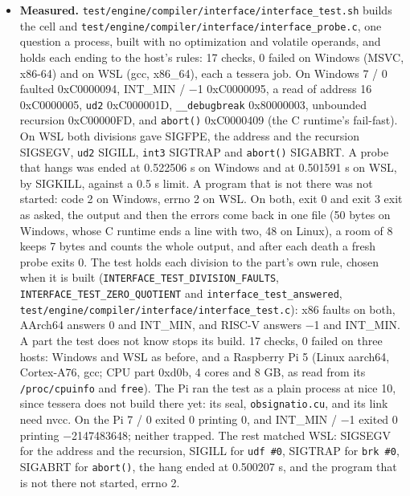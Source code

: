 \begin{enumerate}
\begin{itemize}
\begin{enumerate}
\begin{itemize}
\item \textbf{Measured.} \texttt{test/\allowbreak{}engine/\allowbreak{}compiler/\allowbreak{}interface/\allowbreak{}interface\_\allowbreak{}test.\allowbreak{}sh} builds the cell and \texttt{test/\allowbreak{}engine/\allowbreak{}compiler/\allowbreak{}interface/\allowbreak{}interface\_\allowbreak{}probe.\allowbreak{}c}, one question a process, built with no optimization and volatile operands, and holds each ending to the host's rules: 17 checks, 0 failed on Windows (MSVC, x86-64) and on WSL (gcc, x86\_\allowbreak{}64), each a tessera job. On Windows 7 / 0 faulted 0xC0000094, INT\_\allowbreak{}MIN / −1 0xC0000095, a read of address 16 0xC0000005, \texttt{ud2} 0xC000001D, \texttt{\_\allowbreak{}\_\allowbreak{}debugbreak} 0x80000003, unbounded recursion 0xC00000FD, and \texttt{abort()} 0xC0000409 (the C runtime's fail-fast). On WSL both divisions gave SIGFPE, the address and the recursion SIGSEGV, \texttt{ud2} SIGILL, \texttt{int3} SIGTRAP and \texttt{abort()} SIGABRT. A probe that hangs was ended at 0.522506 s on Windows and at 0.501591 s on WSL, by SIGKILL, against a 0.5 s limit. A program that is not there was not started: code 2 on Windows, errno 2 on WSL. On both, exit 0 and exit 3 exit as asked, the output and then the errors come back in one file (50 bytes on Windows, whose C runtime ends a line with two, 48 on Linux), a room of 8 keeps 7 bytes and counts the whole output, and after each death a fresh probe exits 0. The test holds each division to the part's own rule, chosen when it is built (\texttt{INTERFACE\_\allowbreak{}TEST\_\allowbreak{}DIVISION\_\allowbreak{}FAULTS}, \texttt{INTERFACE\_\allowbreak{}TEST\_\allowbreak{}ZERO\_\allowbreak{}QUOTIENT} and \texttt{interface\_\allowbreak{}test\_\allowbreak{}answered}, \texttt{test/\allowbreak{}engine/\allowbreak{}compiler/\allowbreak{}interface/\allowbreak{}interface\_\allowbreak{}test.\allowbreak{}c}): x86 faults on both, AArch64 answers 0 and INT\_\allowbreak{}MIN, and RISC-V answers −1 and INT\_\allowbreak{}MIN. A part the test does not know stops its build. 17 checks, 0 failed on three hosts: Windows and WSL as before, and a Raspberry Pi 5 (Linux aarch64, Cortex-A76, gcc; CPU part 0xd0b, 4 cores and 8 GB, as read from its \texttt{/\allowbreak{}proc/\allowbreak{}cpuinfo} and \texttt{free}). The Pi ran the test as a plain process at nice 10, since tessera does not build there yet: its seal, \texttt{obsignatio.\allowbreak{}cu}, and its link need nvcc. On the Pi 7 / 0 exited 0 printing 0, and INT\_\allowbreak{}MIN / −1 exited 0 printing −2147483648; neither trapped. The rest matched WSL: SIGSEGV for the address and the recursion, SIGILL for \texttt{udf \#0}, SIGTRAP for \texttt{brk \#0}, SIGABRT for \texttt{abort()}, the hang ended at 0.500207 s, and the program that is not there not started, errno 2.

\end{itemize}
\end{enumerate}
\end{itemize}
\end{enumerate}
